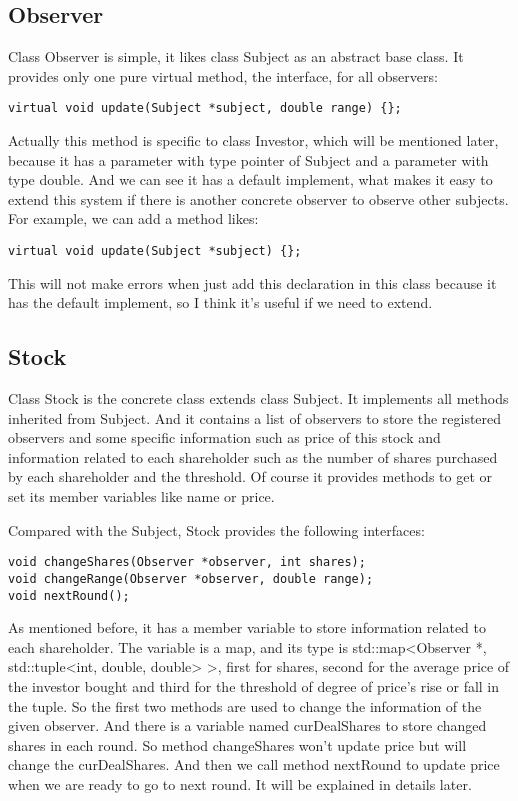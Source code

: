 \documentclass{article}
\begin{document}
\subsection{Observer}
    Class Observer is simple, it likes class Subject as an abstract base class. It provides only one pure virtual method, the interface, for all observers:
    
\begin{lstlisting}
virtual void update(Subject *subject, double range) {};
\end{lstlisting}

    Actually this method is specific to class Investor, which will be mentioned later, because it has a parameter with type pointer of Subject and a parameter with type double. And we can see it has a default implement, what makes it easy to extend this system if there is another concrete observer to observe other subjects. For example, we can add a method likes:

\begin{lstlisting}
virtual void update(Subject *subject) {};
\end{lstlisting}

    This will not make errors when just add this declaration in this class because it has the default implement, so I think it's useful if we need to extend.

\subsection{Stock}
    Class Stock is the concrete class extends class Subject. It implements all methods inherited from Subject. And it contains a list of observers to store the registered observers and some specific information such as price of this stock and information related to each shareholder such as the number of shares purchased by each shareholder and the threshold. Of course it provides methods to get or set its member variables like name or price.
    
    Compared with the Subject, Stock provides the following interfaces:

\begin{lstlisting}
void changeShares(Observer *observer, int shares);
void changeRange(Observer *observer, double range);
void nextRound();
\end{lstlisting}

    As mentioned before, it has a member variable to store information related to each shareholder. The variable is a map, and its type is std::map<Observer *, std::tuple<int, double, double> >, first for shares, second for the average price of the investor bought and third for the threshold of degree of price's rise or fall in the tuple. So the first two methods are used to change the information of the given observer. And there is a variable named curDealShares to store changed shares in each round. So method changeShares won't update price but will change the curDealShares. And then we call method nextRound to update price when we are ready to go to next round. It will be explained in details later.
\end{document}
